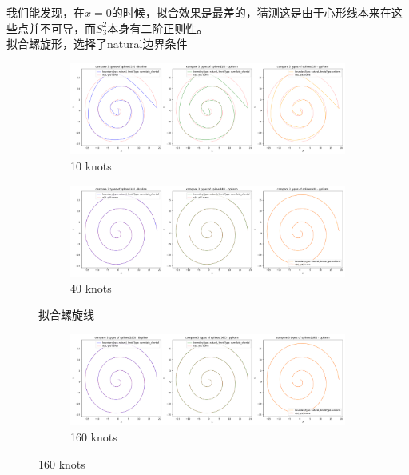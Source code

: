 \documentclass[UTF8]{ctexart}
\begin{document}
我们能发现，在$x=0$的时候，拟合效果是最差的，猜测这是由于心形线本来在这些点并不可导，而$S_3^2$本身有二阶正则性。\\
拟合螺旋形，选择了natural边界条件
	\begin{figure}[H]
	\centering
	\begin{subfigure}[b]{0.45\textwidth}
		\centering
		\includegraphics[width=\textwidth]{../figure/E_curve2.json_3.png}
		\caption{10 knots}
		\label{fig:image1}
	\end{subfigure}
	\hspace{0.5cm}  %
	\begin{subfigure}[b]{0.45\textwidth}
		\centering
		\includegraphics[width=\textwidth]{../figure/E_curve2.json_7.png}
		\caption{40 knots}
		\label{fig:image2}
	\end{subfigure}
	\caption{拟合螺旋线}
	\label{fig:two_images}
\end{figure}
\begin{figure}[H]
	\centering
	\begin{subfigure}[b]{0.45\textwidth}
		\centering
		\includegraphics[width=\textwidth]{../figure/E_curve2.json_11.png}
		\caption{160 knots}
		\label{fig:image1}
	\end{subfigure}
\end{figure}
\end{document}
